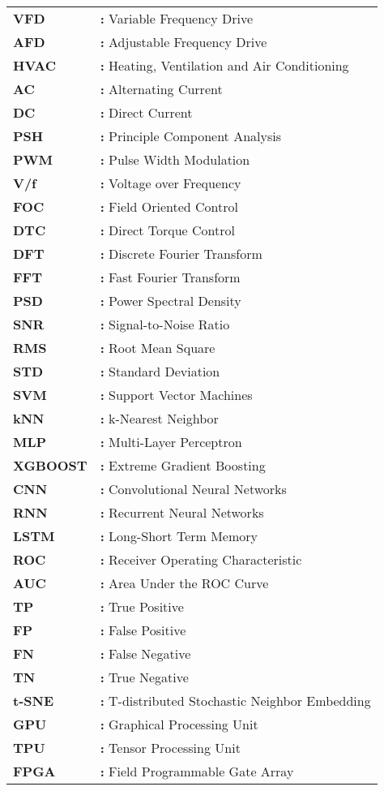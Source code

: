 \begin{tabular}{@{}p{2cm}l}
{\bf{VFD}} & {\bf:} Variable Frequency Drive\\
{\bf AFD} & {\bf:} Adjustable Frequency Drive\\
{\bf HVAC} & {\bf:} Heating, Ventilation and Air Conditioning\\
{\bf AC} & {\bf:} Alternating Current\\
{\bf DC} & {\bf:} Direct Current\\
{\bf PSH} & {\bf:} Principle Component Analysis\\
{\bf PWM} & {\bf:} Pulse Width Modulation\\
{\bf V/f} & {\bf:} Voltage over Frequency\\
{\bf FOC} & {\bf:} Field Oriented Control\\
{\bf DTC} & {\bf:} Direct Torque Control\\
{\bf DFT} & {\bf:} Discrete Fourier Transform\\
{\bf FFT} & {\bf:} Fast Fourier Transform\\
{\bf PSD} & {\bf:} Power Spectral Density\\
{\bf SNR} & {\bf:} Signal-to-Noise Ratio\\
{\bf RMS} & {\bf:} Root Mean Square\\
{\bf STD} & {\bf:} Standard Deviation\\
{\bf SVM} & {\bf:} Support Vector Machines\\
{\bf kNN} & {\bf:} k-Nearest Neighbor\\
{\bf MLP} & {\bf:} Multi-Layer Perceptron\\
{\bf XGBOOST} & {\bf:} Extreme Gradient Boosting\\
{\bf CNN} & {\bf:} Convolutional Neural Networks\\
{\bf RNN} & {\bf:} Recurrent Neural Networks\\
{\bf LSTM} & {\bf:} Long-Short Term Memory\\
{\bf ROC} & {\bf:} Receiver Operating Characteristic\\
{\bf AUC} & {\bf:} Area Under the ROC Curve\\
{\bf TP} & {\bf:} True Positive\\
{\bf FP} & {\bf:} False Positive\\
{\bf FN} & {\bf:} False Negative\\
{\bf TN} & {\bf:} True Negative\\
{\bf t-SNE} & {\bf:} T-distributed Stochastic Neighbor Embedding\\
{\bf GPU} & {\bf:} Graphical Processing Unit\\
{\bf TPU} & {\bf:} Tensor Processing Unit\\
{\bf FPGA} & {\bf:} Field Programmable Gate Array\\
\end{tabular}


